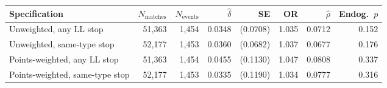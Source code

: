 \begin{tabular}{lrrrrrrr}
\toprule
Specification & $N_{\text{matches}}$ & $N_{\text{events}}$ & $\hat{\delta}$ & SE & OR & $\hat{\rho}$ & Endog.\ $p$ \\
\midrule
Unweighted, any LL stop & 51,363 & 1,454 & 0.0348 & (0.0708) & 1.035 & 0.0712 & 0.152 \\
Unweighted, same-type stop & 52,177 & 1,453 & 0.0360 & (0.0682) & 1.037 & 0.0677 & 0.176 \\
Points-weighted, any LL stop & 51,363 & 1,454 & 0.0455 & (0.1130) & 1.047 & 0.0808 & 0.337 \\
Points-weighted, same-type stop & 52,177 & 1,453 & 0.0335 & (0.1190) & 1.034 & 0.0777 & 0.316 \\
\bottomrule
\end{tabular}
